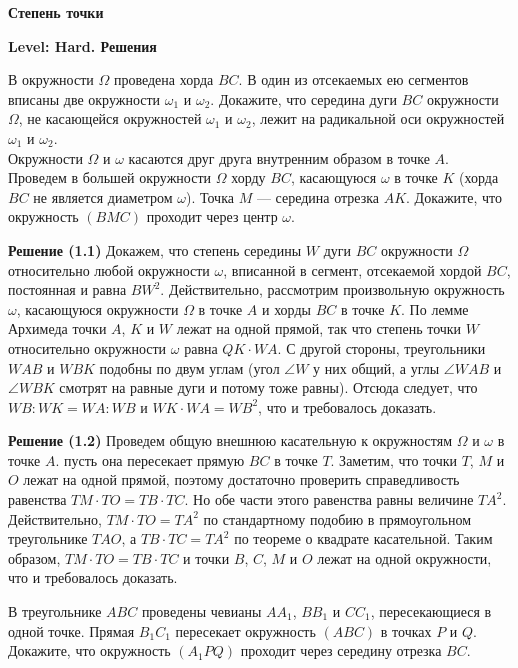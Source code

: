 \centerline{\bf \Huge Степень точки}
\centerline{\bf \Huge Level: Hard. Решения}

В окружности $\Omega$ проведена хорда $BC$. В один из отсекаемых ею сегментов вписаны две окружности $\omega_1$ и $\omega_2$. Докажите, что середина дуги $BC$ окружности $\Omega$, не касающейся окружностей $\omega_1$ и $\omega_2$, лежит на радикальной оси окружностей $\omega_1$ и $\omega_2$. \\

Окружности $\Omega$ и $\omega$ касаются друг друга внутренним образом в точке $A$. Проведем в большей окружности $\Omega$ хорду $BC$, касающуюся $\omega$ в точке $K$ (хорда $BC$ не является диаметром $\omega$). Точка $M$ --- середина отрезка $AK$. Докажите, что окружность $(BMC)$ проходит через центр $\omega$. 

\textbf{Решение (1.1)} Докажем, что степень середины $W$ дуги $BC$ окружности $\Omega$ относительно любой окружности $\omega$, вписанной в сегмент, отсекаемой хордой $BC$, постоянная и равна $BW^2$. Действительно, рассмотрим произвольную окружность $\omega$, касающуюся окружности $\Omega$ в точке $A$ и хорды $BC$ в точке $K$. По лемме Архимеда точки $A$, $K$ и $W$ лежат на одной прямой, так что степень точки $W$ относительно окружности $\omega$ равна $QK\cdot WA$. С другой стороны, треугольники $WAB$ и $WBK$ подобны по двум углам (угол $\angle W$ у них общий, а углы $\angle WAB$ и $\angle WBK$ смотрят на равные дуги и потому тоже равны). Отсюда следует, что $WB:WK=WA:WB$ и $WK\cdot WA=WB^2$, что и требовалось доказать.

\textbf{Решение (1.2)} Проведем общую внешнюю касательную к окружностям $\Omega$ и $\omega$ в точке $A$. пусть она пересекает прямую $BC$ в точке $T$. Заметим, что точки $T$, $M$ и $O$ лежат на одной прямой, поэтому достаточно проверить справедливость равенства $TM\cdot TO=TB\cdot TC$. Но обе части этого равенства равны величине $TA^2$. Действительно, $TM\cdot TO=TA^2$ по стандартному подобию в прямоугольном треугольнике $TAO$, а $TB\cdot TC=TA^2$ по теореме о квадрате касательной. Таким образом, $TM\cdot TO=TB\cdot TC$ и точки $B$, $C$, $M$ и $O$ лежат на одной окружности, что и требовалось доказать.

 В треугольнике $ABC$ проведены чевианы $AA_1$, $BB_1$ и $CC_1$, пересекающиеся в одной точке. Прямая $B_1C_1$ пересекает окружность $(ABC)$ в точках $P$ и $Q$. Докажите, что окружность $(A_1PQ)$ проходит через середину отрезка $BC$.

